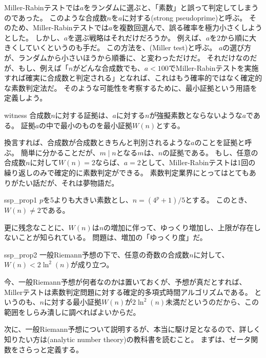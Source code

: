 Miller-Rabinテストでは$a$をランダムに選ぶと、「素数」と誤って判定してしまうのであった。
このような合成数$n$を$a$に対する(strong pseudoprime)と呼ぶ。
そのため、Miller-Rabinテストでは$a$を複数回選んで、誤る確率を極力小さくしようとした。
しかし、$a$を選ぶ戦略はそれだけだろうか。
例えば、$a$を$2$から順に大きくしていくというのも手だ。
この方法を、(Miller test)\cite{10.1145/800116.803773}と呼ぶ。
$a$の選び方が、ランダムから小さいほうから順番に、と変わっただけだ。
それだけなのだが、もし、例えば「$n$がどんな合成数でも、$a<100$でMiller-Rabinテストを実施すれば確実に合成数と判定される」となれば、これはもう確率的ではなく確定的な素数判定法だ。
そのような可能性を考察するために、最小証拠という用語を定義しよう。

\begin{Defi}{}{witness}
合成数$n$に対する証拠は、$a$に対する$n$が強擬素数とならないような$a$である。
証拠$a$の中で最小のものを最小証拠$W(n)$とする。
\end{Defi}

換言すれば、合成数が合成数ときちんと判別されるような$a$のことを証拠と呼ぶ。
簡単に分かることだが、$m \mid n$となる$m$は、$n$の証拠である。
もし、任意の合成数$n$に対して$W(n)=2$ならば、$a=2$として、Miller-Rabinテストは1回の繰り返しのみで確定的に素数判定ができる。
素数判定業界にとってはとてもありがたい話だが、それは夢物語だ。

\begin{Theo}{}{ssp_prop1}
$p$を5よりも大きい素数とし、$n=(4^p+1)/5$とする。
このとき、$W(n)\neq2$である。
\end{Theo}

更に残念なことに、$W(n)$は$n$の増加に伴って、ゆっくり増加し、上限が存在しないことが知られている\cite{10.1007/3-540-58691-1_36}。
問題は、増加の「ゆっくり度」だ。

\begin{Theo}{}{ssp_prop2}
一般Riemann予想の下で、任意の奇数の合成数$n$に対して、$W(n)<2\ln^2(n)$が成り立つ。
\end{Theo}

今、一般Riemann予想が何者なのかは置いておくが、予想が真だとすれば、Millerテストは素数判定問題に対する確定的多項式時間アルゴリズムである。
というのも、$n$に対する最小証拠$W(n)$が$2\ln^2(n)$未満だというのだから、この範囲をしらみ潰しに調べればよいからだ。

次に、一般Riemann予想について説明するが、本当に駆け足となるので、詳しく知りたい方は(analytic number theory)の教科書を読むこと。
まずは、ゼータ関数をさらっと定義する。

